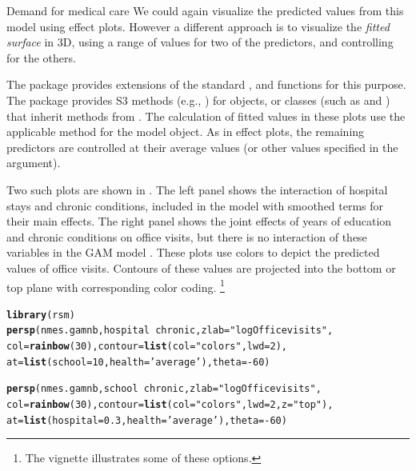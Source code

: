 \documentclass[11pt]{book}\usepackage[]{graphicx}\usepackage[]{color}
\makeatletter
\newcommand{\hlnum}[1]{\textcolor[rgb]{0.686,0.059,0.569}{#1}}%
\newcommand{\hlstr}[1]{\textcolor[rgb]{0.192,0.494,0.8}{#1}}%
\newcommand{\hlopt}[1]{\textcolor[rgb]{0,0,0}{#1}}%
\newcommand{\hlstd}[1]{\textcolor[rgb]{0.345,0.345,0.345}{#1}}%
\newcommand{\hlkwc}[1]{\textcolor[rgb]{0.333,0.667,0.333}{#1}}%
\newcommand{\hlkwd}[1]{\textcolor[rgb]{0.737,0.353,0.396}{\textbf{#1}}}%
\newenvironment{kframe}{%
 \def\at@end@of@kframe{}%
 \ifinner\ifhmode%
  \def\at@end@of@kframe{\end{minipage}}%
  \begin{minipage}{\columnwidth}%
 \fi\fi%
 \def\FrameCommand##1{\hskip\@totalleftmargin \hskip-\fboxsep
 \colorbox{shadecolor}{##1}\hskip-\fboxsep
     \hskip-\linewidth \hskip-\@totalleftmargin \hskip\columnwidth}%
 \MakeFramed {\advance\hsize-\width
   \@totalleftmargin\z@ \linewidth\hsize
   \@setminipage}}%
 {\par\unskip\endMakeFramed%
 \at@end@of@kframe}
\newenvironment{knitrout}{}{} %
\renewenvironment{knitrout}{\small\renewcommand{\baselinestretch}{.85}}{} %
\makeatother
\begin{document}
\begin{Example}[nmes3]{Demand for medical care}
We could again visualize the predicted values from this model using effect plots. However a
different approach is to visualize the \emph{fitted surface} in 3D, using a range of
values for two of the predictors, and controlling for the others.

The  package provides extensions of the standard , 
and  functions for this purpose.  The package provides S3 methods
(e.g., ) for
 objects, or classes (such as  and )
that inherit methods from .  The calculation of fitted values in these
plots use the applicable  method for the model object.
As in effect plots, the remaining predictors are controlled at their average
values (or other values specified in the  argument).

Two such plots are shown in . The left panel shows the interaction of
hospital stays and chronic conditions, included in the model with smoothed terms for their
main effects.  The right panel shows the joint effects of years of education and chronic
conditions on office visits, but there is no interaction of these variables in the GAM model
.
These plots use  colors to depict the predicted values of office visits.
Contours of these values are projected into the bottom or top plane with corresponding
color coding.%
\footnote{The vignette  illustrates some of these options.
}
\begin{knitrout}
\color{fgcolor}\begin{kframe}
\begin{alltt}
\hlkwd{library}\hlstd{(rsm)}
\hlkwd{persp}\hlstd{(nmes.gamnb, hospital} \hlopt{~} \hlstd{chronic,} \hlkwc{zlab}\hlstd{=}\hlstr{"log Office visits"}\hlstd{,}
  \hlkwc{col}\hlstd{=}\hlkwd{rainbow}\hlstd{(}\hlnum{30}\hlstd{),} \hlkwc{contour}\hlstd{=}\hlkwd{list}\hlstd{(}\hlkwc{col}\hlstd{=}\hlstr{"colors"}\hlstd{,} \hlkwc{lwd}\hlstd{=}\hlnum{2}\hlstd{),}
  \hlkwc{at}\hlstd{=}\hlkwd{list}\hlstd{(}\hlkwc{school}\hlstd{=}\hlnum{10}\hlstd{,} \hlkwc{health}\hlstd{=}\hlstr{'average'}\hlstd{),} \hlkwc{theta}\hlstd{=}\hlopt{-}\hlnum{60}\hlstd{)}

\hlkwd{persp}\hlstd{(nmes.gamnb, school} \hlopt{~} \hlstd{chronic,} \hlkwc{zlab}\hlstd{=}\hlstr{"log Office visits"}\hlstd{,}
        \hlkwc{col}\hlstd{=}\hlkwd{rainbow}\hlstd{(}\hlnum{30}\hlstd{),} \hlkwc{contour}\hlstd{=}\hlkwd{list}\hlstd{(}\hlkwc{col}\hlstd{=}\hlstr{"colors"}\hlstd{,} \hlkwc{lwd}\hlstd{=}\hlnum{2}\hlstd{,} \hlkwc{z}\hlstd{=}\hlstr{"top"}\hlstd{),}
  \hlkwc{at}\hlstd{=}\hlkwd{list}\hlstd{(}\hlkwc{hospital}\hlstd{=}\hlnum{0.3}\hlstd{,} \hlkwc{health}\hlstd{=}\hlstr{'average'}\hlstd{),} \hlkwc{theta}\hlstd{=}\hlopt{-}\hlnum{60}\hlstd{)}
\end{alltt}
\end{kframe}\begin{figure}[!htbp]


\end{figure}
\end{knitrout}
\end{Example}
\end{document}
